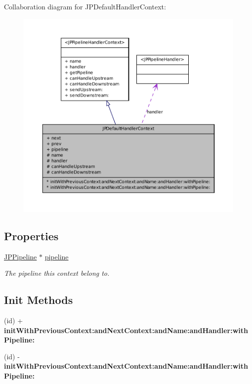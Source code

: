 Collaboration diagram for JPDefaultHandlerContext:\nopagebreak
\begin{figure}[H]
\begin{center}
\leavevmode
\includegraphics[width=400pt]{a00095}
\end{center}
\end{figure}
\subsection*{Properties}
\begin{DoxyCompactItemize}
\item 
\hypertarget{a00011_a596be5fcf184778f762c26640ac2b36d}{
\hyperlink{a00019}{JPPipeline} $\ast$ \hyperlink{a00011_a596be5fcf184778f762c26640ac2b36d}{pipeline}}
\label{a00011_a596be5fcf184778f762c26640ac2b36d}

\begin{DoxyCompactList}\small\item\em The pipeline this context belong to. \item\end{DoxyCompactList}\end{DoxyCompactItemize}
\subsection*{Init Methods}
\begin{DoxyCompactItemize}
\item 
\hypertarget{a00011_ae0cbf5b65295691aa6c76015fc1ed93c}{
(id) + {\bfseries initWithPreviousContext:andNextContext:andName:andHandler:withPipeline:}}
\label{a00011_ae0cbf5b65295691aa6c76015fc1ed93c}

\item 
\hypertarget{a00011_ae0cbf5b65295691aa6c76015fc1ed93c}{
(id) -\/ {\bfseries initWithPreviousContext:andNextContext:andName:andHandler:withPipeline:}}
\label{a00011_ae0cbf5b65295691aa6c76015fc1ed93c}

\end{DoxyCompactItemize}


